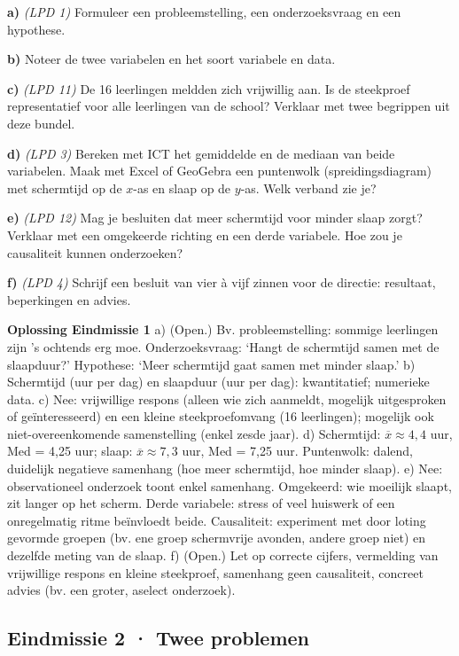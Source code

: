 \textbf{a)} \emph{(LPD 1)} Formuleer een probleemstelling, een onderzoeksvraag en een hypothese. \lijn

\textbf{b)} Noteer de twee variabelen en het soort variabele en data. \lijn

\textbf{c)} \emph{(LPD 11)} De 16 leerlingen meldden zich vrijwillig aan. Is de steekproef representatief voor alle leerlingen van de school? Verklaar met twee begrippen uit deze bundel. \lijn

\textbf{d)} \emph{(LPD 3)} Bereken met ICT het gemiddelde en de mediaan van beide variabelen. Maak met Excel of GeoGebra een puntenwolk (spreidingsdiagram) met schermtijd op de $x$-as en slaap op de $y$-as. Welk verband zie je? \lijn

\textbf{e)} \emph{(LPD 12)} Mag je besluiten dat meer schermtijd voor minder slaap zorgt? Verklaar met een omgekeerde richting en een derde variabele. Hoe zou je causaliteit kunnen onderzoeken? \lijn

\textbf{f)} \emph{(LPD 4)} Schrijf een besluit van vier à vijf zinnen voor de directie: resultaat, beperkingen en advies. \lijn

\begin{oplossing}
\textbf{Oplossing Eindmissie 1} \quad a) (Open.) Bv. probleemstelling: sommige leerlingen zijn ’s ochtends erg moe. Onderzoeksvraag: ‘Hangt de schermtijd samen met de slaapduur?’ Hypothese: ‘Meer schermtijd gaat samen met minder slaap.’ b) Schermtijd (uur per dag) en slaapduur (uur per dag): kwantitatief; numerieke data. c) Nee: vrijwillige respons (alleen wie zich aanmeldt, mogelijk uitgesproken of geïnteresseerd) en een kleine steekproefomvang (16 leerlingen); mogelijk ook niet-overeenkomende samenstelling (enkel zesde jaar). d) Schermtijd: $\overline{x}\approx 4{,}4$ uur, Med = 4,25 uur; slaap: $\overline{x}\approx 7{,}3$ uur, Med = 7,25 uur. Puntenwolk: dalend, duidelijk negatieve samenhang (hoe meer schermtijd, hoe minder slaap). e) Nee: observationeel onderzoek toont enkel samenhang. Omgekeerd: wie moeilijk slaapt, zit langer op het scherm. Derde variabele: stress of veel huiswerk of een onregelmatig ritme beïnvloedt beide. Causaliteit: experiment met door loting gevormde groepen (bv. ene groep schermvrije avonden, andere groep niet) en dezelfde meting van de slaap. f) (Open.) Let op correcte cijfers, vermelding van vrijwillige respons en kleine steekproef, samenhang geen causaliteit, concreet advies (bv. een groter, aselect onderzoek).
\end{oplossing}

\subsection*{Eindmissie 2 · Twee problemen}

